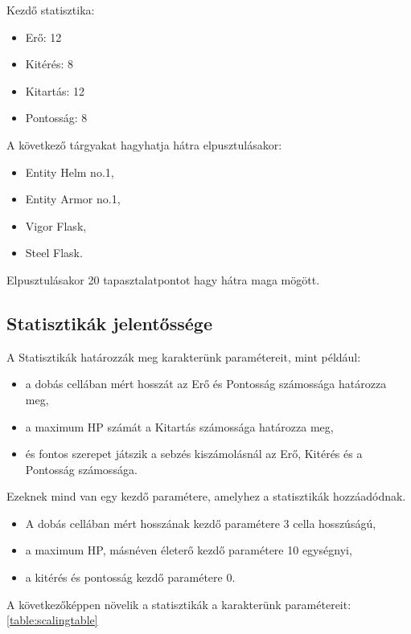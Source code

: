 \noindent Kezdő statisztika:
\begin{itemize}
    \item Erő: 12
    \item Kitérés: 8
    \item Kitartás: 12
    \item Pontosság: 8
\end{itemize}

\noindent A következő tárgyakat hagyhatja hátra elpusztulásakor:

\begin{itemize}
    \item Entity Helm no.1,
    \item Entity Armor no.1,
    \item Vigor Flask,
    \item Steel Flask.
\end{itemize}

\noindent Elpusztulásakor 20 tapasztalatpontot hagy hátra maga mögött.

\subsection{Statisztikák jelentőssége}

A Statisztikák határozzák meg karakterünk paramétereit, mint például:
\begin{itemize}
    \item a dobás cellában mért hosszát az Erő és Pontosság számossága határozza meg,
    \item a maximum HP számát a Kitartás számossága határozza meg,
    \item és fontos szerepet játszik a sebzés kiszámolásnál az Erő, Kitérés és a Pontosság számossága.
\end{itemize}

\noindent Ezeknek mind van egy kezdő paramétere, amelyhez a statisztikák hozzáadódnak.

\begin{itemize}
    \item \label{Dobás} A dobás cellában mért hosszának kezdő paramétere 3 cella hosszúságú,
    \item a maximum HP, másnéven életerő kezdő paramétere 10 egységnyi,
    \item a kitérés és pontosság kezdő paramétere 0.
\end{itemize}

\noindent A következőképpen növelik a statisztikák a karakterünk paramétereit: \ref{table:scalingtable}

